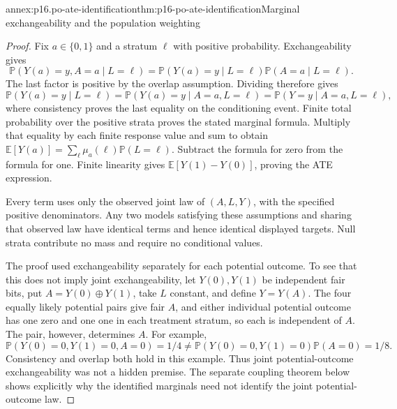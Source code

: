 \begin{annexitem}{annex:p16.po-ate-identification}{thm:p16-po-ate-identification}{Marginal exchangeability and the population weighting}
\begin{proof}
Fix \(a\in\{0,1\}\) and a stratum \(\ell\) with positive
probability. Exchangeability gives
\[
 \mathbb P(Y(a)=y,A=a\mid L=\ell)
 =\mathbb P(Y(a)=y\mid L=\ell)\mathbb P(A=a\mid L=\ell).
\]
The last factor is positive by the overlap assumption. Dividing
therefore gives
\[
 \mathbb P(Y(a)=y\mid L=\ell)
 =\mathbb P(Y(a)=y\mid A=a,L=\ell)
 =\mathbb P(Y=y\mid A=a,L=\ell),
\]
where consistency proves the last equality on the conditioning event.
Finite total probability over the positive strata proves the stated
marginal formula. Multiply that equality by each finite response
value and sum to obtain
\(\mathbb E[Y(a)]=\sum_\ell\mu_a(\ell)\mathbb P(L=\ell)\).
Subtract the formula for zero from the formula for one. Finite
linearity gives \(\mathbb E[Y(1)-Y(0)]\), proving the ATE expression.

Every term uses only the observed joint law of \((A,L,Y)\), with
the specified positive denominators. Any two models satisfying these
assumptions and sharing that observed law have identical terms and
hence identical displayed targets. Null strata contribute no mass
and require no conditional values.

The proof used exchangeability separately for each potential outcome.
To see that this does not imply joint exchangeability, let
\(Y(0),Y(1)\) be independent fair bits, put
\(A=Y(0)\oplus Y(1)\), take \(L\) constant, and define
\(Y=Y(A)\). The four equally likely potential pairs give fair
\(A\), and either individual potential outcome has one zero and
one one in each treatment stratum, so each is independent of \(A\).
The pair, however, determines \(A\). For example,
\[
 \mathbb P(Y(0)=0,Y(1)=0,A=0)=1/4
 \ne \mathbb P(Y(0)=0,Y(1)=0)\mathbb P(A=0)=1/8.
\]
Consistency and overlap both hold in this example. Thus joint
potential-outcome exchangeability was not a hidden premise. The
separate coupling theorem below shows explicitly why the identified
marginals need not identify the joint potential-outcome law.
\end{proof}
\end{annexitem}

